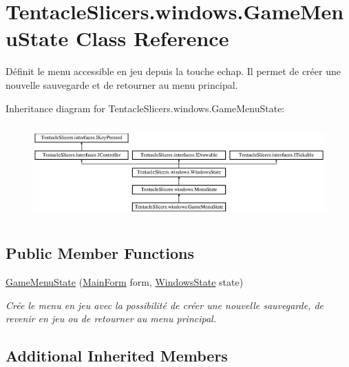 \hypertarget{class_tentacle_slicers_1_1windows_1_1_game_menu_state}{}\section{Tentacle\+Slicers.\+windows.\+Game\+Menu\+State Class Reference}
\label{class_tentacle_slicers_1_1windows_1_1_game_menu_state}


Définit le menu accessible en jeu depuis la touche echap. Il permet de créer une nouvelle sauvegarde et de retourner au menu principal.  


Inheritance diagram for Tentacle\+Slicers.\+windows.\+Game\+Menu\+State\+:\begin{figure}[H]
\begin{center}
\leavevmode
\includegraphics[height=3.660131cm]{class_tentacle_slicers_1_1windows_1_1_game_menu_state}
\end{center}
\end{figure}
\subsection*{Public Member Functions}
\begin{DoxyCompactItemize}
\item 
\hyperlink{class_tentacle_slicers_1_1windows_1_1_game_menu_state_ae27e4df91ed86b51f7b89b3f368db912}{Game\+Menu\+State} (\hyperlink{class_tentacle_slicers_1_1windows_1_1_main_form}{Main\+Form} form, \hyperlink{class_tentacle_slicers_1_1windows_1_1_windows_state}{Windows\+State} state)
\begin{DoxyCompactList}\small\item\em Crée le menu en jeu avec la possibilité de créer une nouvelle sauvegarde, de revenir en jeu ou de retourner au menu principal. \end{DoxyCompactList}\end{DoxyCompactItemize}
\subsection*{Additional Inherited Members}


